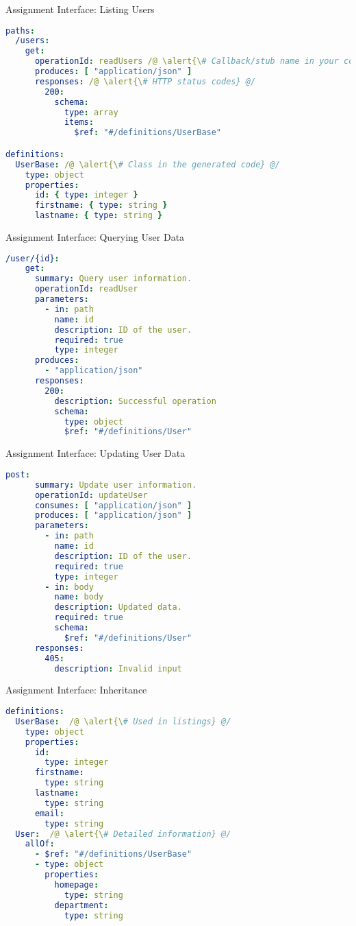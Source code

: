 \begin{frame}[fragile]{Assignment Interface: Listing Users}
\begin{lstlisting}[language=yaml,style=mini]
paths:
  /users:
    get:
      operationId: readUsers /@ \alert{\# Callback/stub name in your code} @/
      produces: [ "application/json" ]
      responses: /@ \alert{\# HTTP status codes} @/
        200:
          schema:
            type: array
            items:
              $ref: "#/definitions/UserBase"

definitions:
  UserBase: /@ \alert{\# Class in the generated code} @/
    type: object
    properties:
      id: { type: integer }
      firstname: { type: string }
      lastname: { type: string }
\end{lstlisting}
\end{frame}


\begin{frame}[fragile]{Assignment Interface: Querying User Data}
\begin{lstlisting}[language=yaml,style=mini]
  /user/{id}:
    get:
      summary: Query user information.
      operationId: readUser
      parameters:
        - in: path
          name: id
          description: ID of the user.
          required: true
          type: integer
      produces:
        - "application/json"
      responses:
        200:
          description: Successful operation
          schema:
            type: object
            $ref: "#/definitions/User"
\end{lstlisting}
\end{frame}


\begin{frame}[fragile]{Assignment Interface: Updating User Data}
\begin{lstlisting}[language=yaml,style=mini]
    post:
      summary: Update user information.
      operationId: updateUser
      consumes: [ "application/json" ]
      produces: [ "application/json" ]
      parameters:
        - in: path
          name: id
          description: ID of the user.
          required: true
          type: integer
        - in: body
          name: body
          description: Updated data.
          required: true
          schema:
            $ref: "#/definitions/User"
      responses:
        405:
          description: Invalid input
\end{lstlisting}
\end{frame}


\begin{frame}[fragile]{Assignment Interface: Inheritance}
\begin{lstlisting}[language=yaml,style=mini]
definitions:
  UserBase:  /@ \alert{\# Used in listings} @/
    type: object
    properties:
      id:
        type: integer
      firstname:
        type: string
      lastname:
        type: string
      email:
        type: string
  User:  /@ \alert{\# Detailed information} @/
    allOf:
      - $ref: "#/definitions/UserBase"
      - type: object
        properties:
          homepage:
            type: string
          department:
            type: string
\end{lstlisting}
\end{frame}



